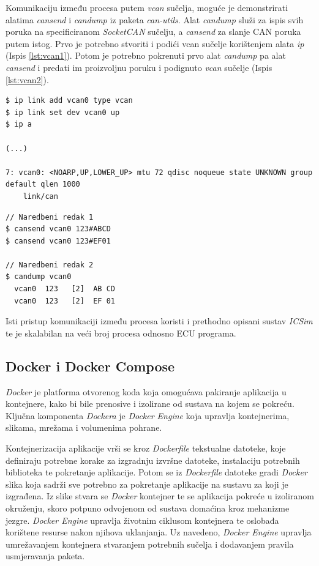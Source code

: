 \documentclass[times, utf8, diplomski, numeric]{fer}
\begin{document}
Komunikaciju između procesa putem \textit{vcan} sučelja, moguće je demonstrirati alatima \textit{cansend} i \textit{candump} iz paketa \textit{can-utils}. Alat \textit{candump} služi za ispis svih poruka na specificiranom \textit{SocketCAN} sučelju, a \textit{cansend} za slanje CAN poruka putem istog. Prvo je potrebno stvoriti i podići vcan sučelje korištenjem alata \textit{ip} (Ispis \ref{lst:vcan1}). Potom je potrebno pokrenuti prvo alat \textit{candump} pa alat \textit{cansend} i predati im proizvoljnu poruku i podignuto \textit{vcan} sučelje (Ispis \ref{lst:vcan2}).
\newpage
\begin{lstlisting}[style=terminal, label={lst:vcan1},caption={Stvaranje i podizanje \textit{vcan} sučelja}]
$ ip link add vcan0 type vcan
$ ip link set dev vcan0 up
$ ip a

(...)

7: vcan0: <NOARP,UP,LOWER_UP> mtu 72 qdisc noqueue state UNKNOWN group default qlen 1000
    link/can 
\end{lstlisting}
\begin{lstlisting}[style=terminal, label={lst:vcan2},caption={IPC putem \textit{vcan} sučelja}]
// Naredbeni redak 1
$ cansend vcan0 123#ABCD
$ cansend vcan0 123#EF01

// Naredbeni redak 2
$ candump vcan0
  vcan0  123   [2]  AB CD
  vcan0  123   [2]  EF 01
\end{lstlisting}

Isti pristup komunikaciji između procesa koristi i prethodno opisani sustav \textit{ICSim} te je skalabilan na veći broj procesa odnosno ECU programa.

\subsection{Docker i Docker Compose}
\textit{Docker} je platforma otvorenog koda koja omogućava pakiranje aplikacija u kontejnere, kako bi bile prenosive i izolirane od sustava na kojem se pokreću. Ključna komponenta \textit{Dockera} je \textit{Docker Engine} koja upravlja kontejnerima, slikama, mrežama i volumenima pohrane. 

Kontejnerizacija aplikacije vrši se kroz \textit{Dockerfile} tekstualne datoteke, koje definiraju potrebne korake za izgradnju izvršne datoteke, instalaciju potrebnih biblioteka te pokretanje aplikacije. Potom se iz \textit{Dockerfile} datoteke gradi \textit{Docker} slika koja sadrži sve potrebno za pokretanje aplikacije na sustavu za koji je izgrađena. Iz slike stvara se \textit{Docker} kontejner te se aplikacija pokreće u izoliranom okruženju, skoro potpuno odvojenom od sustava domaćina kroz mehanizme jezgre. \textit{Docker Engine} upravlja životnim ciklusom kontejnera te oslobađa korištene resurse nakon njihova uklanjanja. Uz navedeno, \textit{Docker Engine} upravlja umrežavanjem kontejnera stvaranjem potrebnih sučelja i dodavanjem pravila usmjeravanja paketa.
\end{document}
